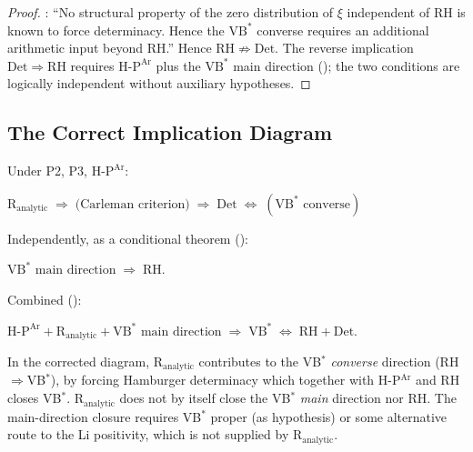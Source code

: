 \begin{proof}
: ``No structural
property of the zero distribution of \(\xi\) independent of RH is
known to force determinacy. Hence the \(\mathrm{VB}^{*}\) converse
requires an additional arithmetic input beyond RH.'' Hence
\(\mathrm{RH}\not\Rightarrow\mathrm{Det}\). The reverse implication
\(\mathrm{Det}\Rightarrow\mathrm{RH}\) requires
\(\mathrm{H\text{-}P}^{\mathrm{Ar}}\) plus the \(\mathrm{VB}^{*}\)
main direction (); the
two conditions are logically independent without auxiliary
hypotheses.
\end{proof}

\subsection{The Correct Implication Diagram}
\label{v4-arith:r-audit:corrected-chain}

\begin{remark}
\label{v4-arith:r-audit:diag:chain}
Under P2, P3, \(\mathrm{H\text{-}P}^{\mathrm{Ar}}\):
\begin{center}
\(\mathrm{R}_{\mathrm{analytic}}\;\Longrightarrow\;\text{(Carleman criterion)}\;\Longrightarrow\;\mathrm{Det}\;\Longleftrightarrow\;(\mathrm{VB}^{*}\text{ converse})\)
\end{center}
Independently, as a conditional theorem
():
\begin{center}
\(\mathrm{VB}^{*}\text{ main direction}\;\Longrightarrow\;\mathrm{RH}.\)
\end{center}
Combined ():
\begin{center}
\(\mathrm{H\text{-}P}^{\mathrm{Ar}}+\mathrm{R}_{\mathrm{analytic}}+\mathrm{VB}^{*}\text{ main direction}\;\Longrightarrow\;\mathrm{VB}^{*}\;\Longleftrightarrow\;\mathrm{RH}+\mathrm{Det}.\)
\end{center}
\end{remark}

\begin{remark}
\label{v4-arith:r-audit:rem:closes-converse}
In the corrected diagram, \(\mathrm{R}_{\mathrm{analytic}}\) contributes
to the VB\(^{*}\) \emph{converse} direction (RH\(\Rightarrow\)VB\(^{*}\)),
by forcing Hamburger determinacy which together with H-P\(^{\mathrm{Ar}}\)
and RH closes VB\(^{*}\). \(\mathrm{R}_{\mathrm{analytic}}\) does not
by itself close the VB\(^{*}\) \emph{main} direction nor RH. The
main-direction closure requires VB\(^{*}\) proper (as hypothesis) or
some alternative route to the Li positivity, which is not supplied
by \(\mathrm{R}_{\mathrm{analytic}}\).
\end{remark}

